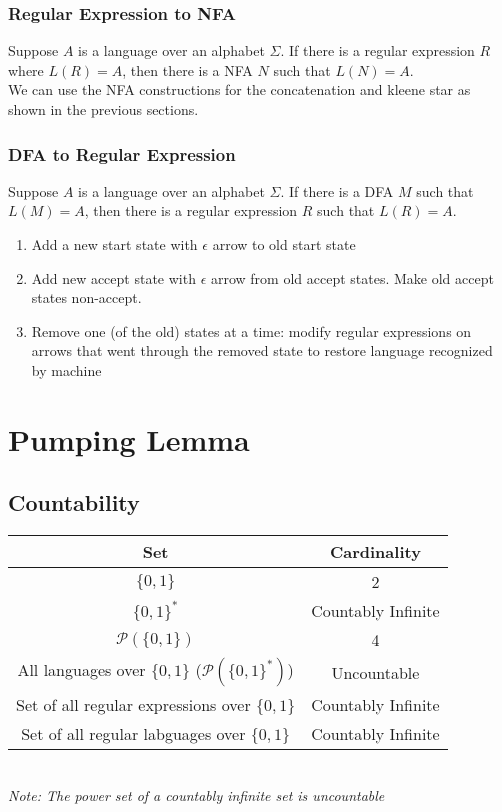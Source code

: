 \documentclass{article}
\begin{document}
\subsubsection{Regular Expression to NFA}
Suppose $A$ is a language over an alphabet $\Sigma$. If there is a regular expression $R$ where $L(R)=A$, then there is a NFA $N$ such that $L(N)=A$.\\
\newline
We can use the NFA constructions for the concatenation and kleene star as shown in the previous sections.\\
\newpage
\subsubsection{DFA to Regular Expression}
Suppose $A$ is a language over an alphabet $\Sigma$. If there is a DFA $M$ such that $L(M)=A$, then there is a regular expression $R$ such that $L(R)=A$.\\
\begin{enumerate}
    \item Add a new start state with $\epsilon$ arrow to old start state
    \item Add new accept state with $\epsilon$ arrow from old accept states. Make old accept states non-accept.
    \item Remove one (of the old) states at a time: modify regular expressions on arrows that went through the removed state to restore language recognized by machine
\end{enumerate}
\section{Pumping Lemma}
\label{sec:pumpLemma}
\subsection{Countability}
\begin{tabular}{c|c}
    Set & Cardinality \\
    \hline
    $\{0,1\}$ & 2\\
    $\{0,1\}^*$& Countably Infinite\\
    $\mathcal{P}(\{0,1\})$&4\\
    All languages over $\{0,1\}$ ($\mathcal{P}(\{0,1\}^*)$)&Uncountable\\
    Set of all regular expressions over $\{0,1\}$&Countably Infinite\\
    Set of all regular labguages over $\{0,1\}$&Countably Infinite
\end{tabular}\\
\textit{Note: The power set of a countably infinite set is uncountable}
\end{document}
